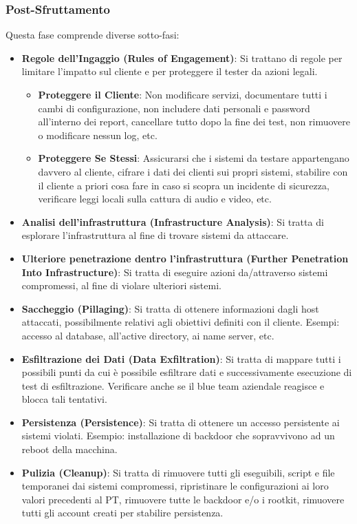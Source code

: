 \documentclass{article}
\begin{document}
\subsubsection{Post-Sfruttamento}
Questa fase comprende diverse sotto-fasi:
\begin{itemize}
    \item \textbf{Regole dell'Ingaggio (Rules of Engagement)}: Si trattano di regole per limitare l'impatto sul cliente e per proteggere il tester da azioni legali.
    \begin{itemize}
        \item \textbf{Proteggere il Cliente}: Non modificare servizi, documentare tutti i cambi di configurazione, non includere dati personali e password all’interno dei report, cancellare tutto dopo la fine dei test, non rimuovere o modificare nessun log, etc.

        \item \textbf{Proteggere Se Stessi}: Assicurarsi che i sistemi da testare appartengano davvero al cliente, cifrare i dati dei clienti sui propri sistemi, stabilire con il cliente a priori cosa fare in caso si scopra un incidente di sicurezza, verificare leggi locali sulla cattura di audio e video, etc.
    \end{itemize}

    \item \textbf{Analisi dell'infrastruttura (Infrastructure Analysis)}: Si tratta di esplorare l’infrastruttura al fine di trovare sistemi da attaccare.

    \item \textbf{Ulteriore penetrazione dentro l’infrastruttura (Further Penetration Into Infrastructure)}: Si tratta di eseguire azioni
    da/attraverso sistemi compromessi, al fine di violare ulteriori sistemi.

    \item \textbf{Saccheggio (Pillaging)}: Si tratta di ottenere informazioni dagli host attaccati, possibilmente relativi agli obiettivi definiti con il cliente. Esempi: accesso al database, all’active directory, ai name server, etc.

    \item \textbf{Esfiltrazione dei Dati (Data Exfiltration)}: Si tratta di mappare tutti i possibili punti da cui è possibile esfiltrare dati e successivamente esecuzione di test di esfiltrazione. Verificare anche se il blue team aziendale reagisce e blocca tali tentativi.

    \item \textbf{Persistenza (Persistence)}: Si tratta di ottenere un accesso persistente ai sistemi violati. Esempio: installazione di backdoor che sopravvivono ad un reboot della macchina.

    \item \textbf{Pulizia (Cleanup)}: Si tratta di rimuovere tutti gli eseguibili, script e file temporanei dai sistemi compromessi, ripristinare le configurazioni ai loro valori precedenti al PT, rimuovere tutte le backdoor e/o i rootkit, rimuovere tutti gli account creati per stabilire persistenza.    
\end{itemize}
\newpage
\end{document}
